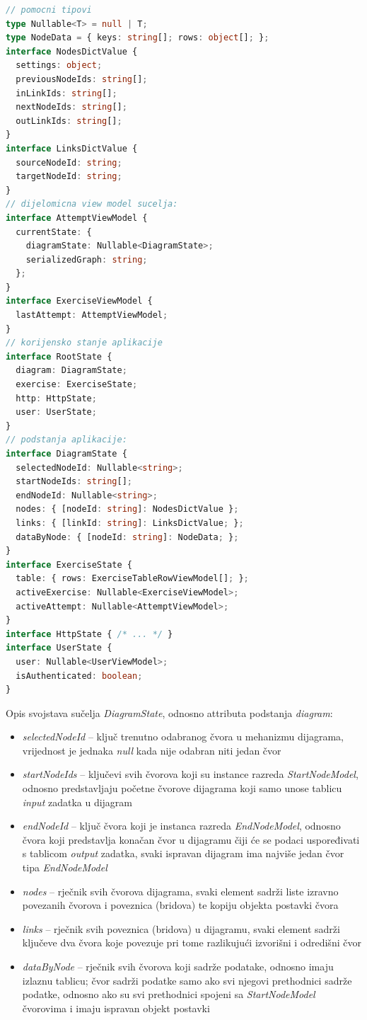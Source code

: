 \documentclass[times, utf8, diplomski, numeric]{fer}
\newcommand{\razmakp}{\vspace{18pt}}
\newcommand{\razmaks}{\vspace{10pt}}
\begin{document}
\razmakp %
\begin{lstlisting}[language=TypeScript, caption={Pojednostavljena verzija sučelja stanja aplikacije}, label={lst:state}]
// pomocni tipovi
type Nullable<T> = null | T;
type NodeData = { keys: string[]; rows: object[]; };
interface NodesDictValue {
  settings: object;
  previousNodeIds: string[];
  inLinkIds: string[];
  nextNodeIds: string[];
  outLinkIds: string[];
}
interface LinksDictValue {
  sourceNodeId: string;
  targetNodeId: string;
}
// dijelomicna view model sucelja:
interface AttemptViewModel {
  currentState: {
    diagramState: Nullable<DiagramState>;
    serializedGraph: string;
  };
}
interface ExerciseViewModel {
  lastAttempt: AttemptViewModel;
}
// korijensko stanje aplikacije
interface RootState {
  diagram: DiagramState;
  exercise: ExerciseState;
  http: HttpState;
  user: UserState;
}
// podstanja aplikacije:
interface DiagramState {
  selectedNodeId: Nullable<string>;
  startNodeIds: string[];
  endNodeId: Nullable<string>;
  nodes: { [nodeId: string]: NodesDictValue };
  links: { [linkId: string]: LinksDictValue; };
  dataByNode: { [nodeId: string]: NodeData; };
}
interface ExerciseState {
  table: { rows: ExerciseTableRowViewModel[]; };
  activeExercise: Nullable<ExerciseViewModel>;
  activeAttempt: Nullable<AttemptViewModel>;
}
interface HttpState { /* ... */ }
interface UserState {
  user: Nullable<UserViewModel>;
  isAuthenticated: boolean;
}
\end{lstlisting}
\razmaks

\noindent Opis svojstava sučelja \emph{DiagramState}, odnosno attributa podstanja \emph{diagram}:

\begin{itemize}
    \item \emph{selectedNodeId} -- ključ trenutno odabranog čvora u mehanizmu dijagrama, vrijednost je jednaka \emph{null} kada nije odabran niti jedan čvor
    \item \emph{startNodeIds} -- ključevi svih čvorova koji su instance razreda \emph{StartNodeModel}, odnosno predstavljaju početne čvorove dijagrama koji samo unose tablicu \emph{input} zadatka u dijagram
    \item \emph{endNodeId} -- ključ čvora koji je instanca razreda \emph{EndNodeModel}, odnosno čvora koji predstavlja konačan čvor u dijagramu čiji će se podaci uspoređivati s tablicom \emph{output} zadatka, svaki ispravan dijagram ima najviše jedan čvor tipa \emph{EndNodeModel}
    \item \emph{nodes} -- rječnik svih čvorova dijagrama, svaki element sadrži liste izravno povezanih čvorova i poveznica (bridova) te kopiju objekta postavki čvora
    \item \emph{links} -- rječnik svih poveznica (bridova) u dijagramu, svaki element sadrži ključeve dva čvora koje povezuje pri tome razlikujući izvorišni i odredišni čvor
    \item \emph{dataByNode} -- rječnik svih čvorova koji sadrže podatake, odnosno imaju izlaznu tablicu; čvor sadrži podatke samo ako svi njegovi prethodnici sadrže podatke, odnosno ako su svi prethodnici spojeni sa \emph{StartNodeModel} čvorovima i imaju ispravan objekt postavki
\end{itemize}
\end{document}
